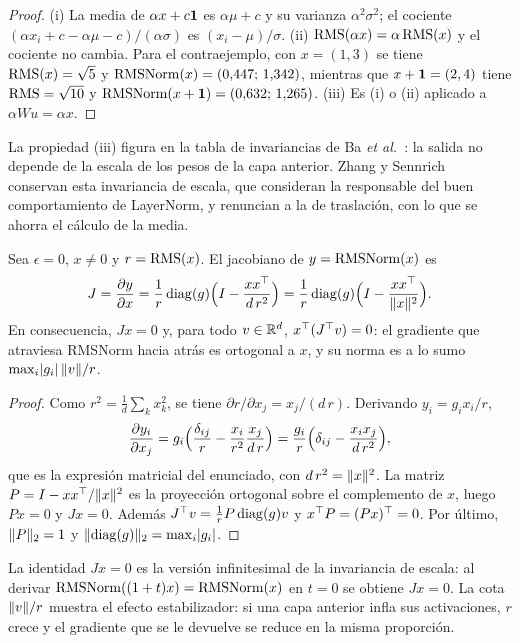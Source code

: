 \begin{proof}
(i) La media de $\alpha x+c\mathbf{1}$ es $\alpha\mu+c$ y su varianza $\alpha^{2}\sigma^{2}$; el cociente $(\alpha x_i+c-\alpha\mu-c)/(\alpha\sigma)$ es $(x_i-\mu)/\sigma$. (ii) $\operatorname{RMS}(\alpha x)=\alpha\operatorname{RMS}(x)$ y el cociente no cambia. Para el contraejemplo, con $x=(1,3)$ se tiene $\operatorname{RMS}(x)=\sqrt5$ y $\operatorname{RMSNorm}(x)=(0{,}447;\,1{,}342)$, mientras que $x+\mathbf{1}=(2,4)$ tiene $\operatorname{RMS}=\sqrt{10}$ y $\operatorname{RMSNorm}(x+\mathbf{1})=(0{,}632;\,1{,}265)$. (iii) Es (i) o (ii) aplicado a $\alpha Wu=\alpha x$.
\end{proof}

La propiedad (iii) figura en la tabla de invariancias de Ba \emph{et al.}~\cite[§5.1]{layernorm}: la salida no depende de la escala de los pesos de la capa anterior. Zhang y Sennrich~\cite{rmsnorm} conservan esta invariancia de escala, que consideran la responsable del buen comportamiento de LayerNorm, y renuncian a la de traslación, con lo que se ahorra el cálculo de la media.

\begin{teorema}\label{teo:jac-rms}
Sea $\epsilon=0$, $x\ne 0$ y $r=\operatorname{RMS}(x)$. El jacobiano de $y=\operatorname{RMSNorm}(x)$ es
\[
J=\frac{\partial y}{\partial x}=\frac1r\operatorname{diag}(g)\Bigl(I-\frac{xx^{\top}}{d\,r^{2}}\Bigr)
=\frac1r\operatorname{diag}(g)\Bigl(I-\frac{xx^{\top}}{\lVert x\rVert^{2}}\Bigr).
\]
En consecuencia, $Jx=0$ y, para todo $v\in\mathbb{R}^{d}$, $x^{\top}(J^{\top} v)=0$: el gradiente que atraviesa RMSNorm hacia atrás es ortogonal a $x$, y su norma es a lo sumo $\max_i\lvert g_i\rvert\,\lVert v\rVert/r$.
\end{teorema}

\begin{proof}
Como $r^{2}=\frac1d\sum_kx_k^{2}$, se tiene $\partial r/\partial x_j=x_j/(d\,r)$. Derivando $y_i=g_ix_i/r$,
\[
\frac{\partial y_i}{\partial x_j}=g_i\Bigl(\frac{\delta_{ij}}{r}-\frac{x_i}{r^{2}}\frac{x_j}{d\,r}\Bigr)=\frac{g_i}{r}\Bigl(\delta_{ij}-\frac{x_ix_j}{d\,r^{2}}\Bigr),
\]
que es la expresión matricial del enunciado, con $d\,r^{2}=\lVert x\rVert^{2}$. La matriz $P=I-xx^{\top}/\lVert x\rVert^{2}$ es la proyección ortogonal sobre el complemento de $x$, luego $Px=0$ y $Jx=0$. Además $J^{\top} v=\frac1rP\operatorname{diag}(g)v$ y $x^{\top} P=(Px)^{\top}=0$. Por último, $\lVert P\rVert_2=1$ y $\lVert\operatorname{diag}(g)\rVert_2=\max_i\lvert g_i\rvert$.
\end{proof}

La identidad $Jx=0$ es la versión infinitesimal de la invariancia de escala: al derivar $\operatorname{RMSNorm}((1+t)x)=\operatorname{RMSNorm}(x)$ en $t=0$ se obtiene $Jx=0$. La cota $\lVert v\rVert/r$ muestra el efecto estabilizador: si una capa anterior infla sus activaciones, $r$ crece y el gradiente que se le devuelve se reduce en la misma proporción.

